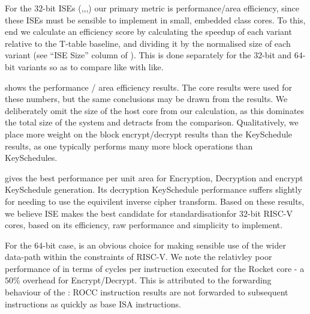 For the $32$-bit ISEs 
(,,,)
our primary metric is
performance/area efficiency, since these ISEs must be sensible to
implement in small, embedded class cores.
To this, end we calculate an efficiency score by calculating the speedup
of each variant relative to the T-table baseline, and dividing it
by the normalised size of each variant
(see ``ISE Size'' column of ).
This is done separately for the $32$-bit and $64$-bit variants so as
to compare like with like.

 shows the performance / area efficiency results.
The  core results were used for these numbers, but the
same conclusions may be drawn from the  results.
We deliberately omit the size of the host core from our calculation,
as this dominates the total size of the system and detracts from
the comparison.
Qualitatively, we place more weight on the block encrypt/decrypt results
than the KeySchedule results, as one typically performs many more
block operations than KeySchedules.

 gives the best performance per unit area
for Encryption, Decryption and encrypt KeySchedule generation.
Its decryption KeySchedule performance suffers slightly for needing
to use the equivilent inverse cipher transform.
Based on these results, we believe ISE  makes the best candidate for
standardisationfor $32$-bit RISC-V cores,
based on its efficiency, raw performance and simplicity to implement.

For the $64$-bit case,  is an obvious choice for making
sensible use of the wider data-path within the constraints of RISC-V.
We note the relativley poor performance of  in terms of cycles
per instruction executed for the Rocket core - a $50\%$ overhead for
Encrypt/Decrypt.
This is attributed to the forwarding behaviour of the :
ROCC instruction results are not
forwarded to subsequent instructions as quickly as base ISA
instructions.

